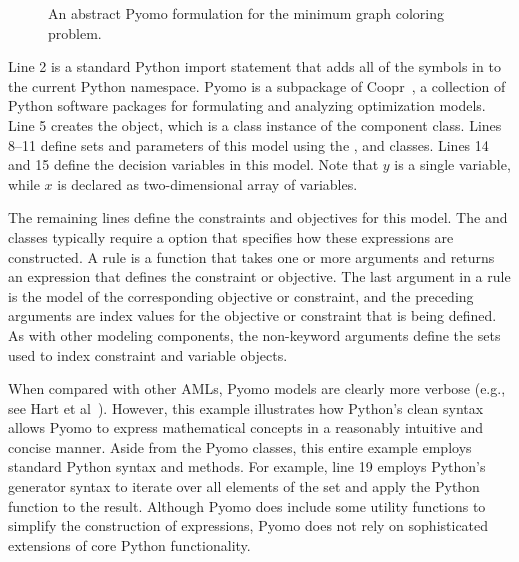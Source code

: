 \begin{figure}[htbp]

\caption{\label{fig:intro:min-graph-coloring}An abstract Pyomo formulation for the minimum graph coloring problem.}
\end{figure}

Line 2 is a standard Python import statement that adds
all of the symbols in  to the current Python
namespace.  Pyomo is a subpackage of Coopr~\cite{Coopr}, a
collection of Python software packages for formulating and analyzing
optimization models.  Line 5 creates the 
object, which is a class instance of the 
component
class. Lines 8--11 define sets and parameters
of this model using the ,
 and
 classes. Lines 14 and 15 define the
decision variables in this model.  Note that $y$ is a single variable,
while $x$ is declared as two-dimensional array of variables.

The remaining lines define the constraints and objectives for this model.
The  and  classes typically require a
 option that specifies how these expressions are constructed.
A rule is a function that takes one or more arguments and returns an
expression that defines the constraint or objective. The last argument
in a rule is the model of the corresponding objective or constraint, and
the preceding arguments are index values for the objective or constraint
that is being defined.  As with other modeling components, the non-keyword
arguments define the sets used to index constraint and variable objects.

When compared with other AMLs, Pyomo models are clearly more verbose
(e.g., see Hart et al~\cite{hartetal11}).  However, this example
illustrates how Python's clean syntax allows Pyomo to express mathematical
concepts in a reasonably intuitive and concise manner.  Aside from
the Pyomo classes, this entire example employs standard Python syntax
and methods.  For example, line 19 employs Python's generator syntax to
iterate over all elements of the  set and apply the Python
 function to the result.  Although Pyomo does include some
utility functions to simplify the construction of expressions, Pyomo
does not rely on sophisticated extensions of core Python functionality.


